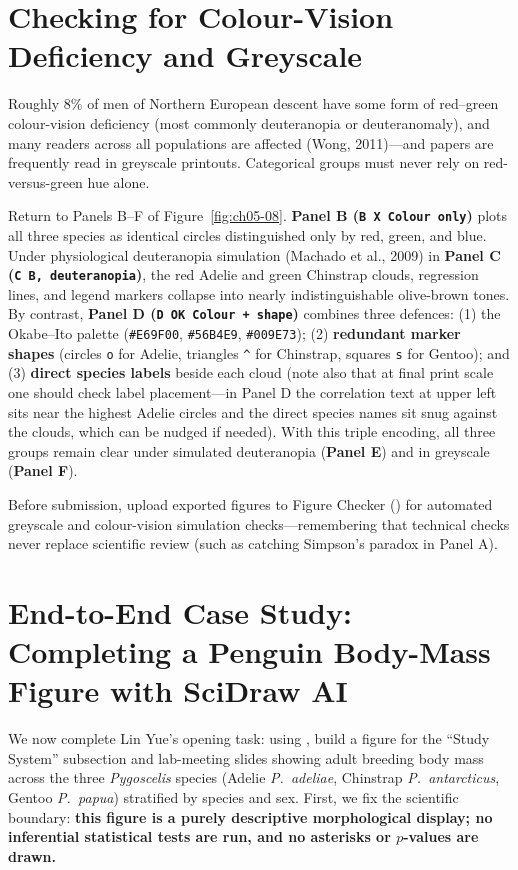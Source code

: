 \section{Checking for Colour-Vision Deficiency and Greyscale}

Roughly 8\% of men of Northern European descent have some form of red--green colour-vision deficiency (most commonly deuteranopia or deuteranomaly), and many readers across all populations are affected (Wong, 2011)—and papers are frequently read in greyscale printouts. Categorical groups must never rely on red-versus-green hue alone.

Return to Panels B--F of Figure~\ref{fig:ch05-08}. \textbf{Panel B (\texttt{B X Colour only})} plots all three species as identical circles distinguished only by red, green, and blue. Under physiological deuteranopia simulation (Machado et al., 2009) in \textbf{Panel C (\texttt{C B, deuteranopia})}, the red Adelie and green Chinstrap clouds, regression lines, and legend markers collapse into nearly indistinguishable olive-brown tones. By contrast, \textbf{Panel D (\texttt{D OK Colour + shape})} combines three defences: (1) the Okabe--Ito palette (\texttt{\#E69F00}, \texttt{\#56B4E9}, \texttt{\#009E73}); (2) \textbf{redundant marker shapes} (circles \texttt{o} for Adelie, triangles \texttt{\^{}} for Chinstrap, squares \texttt{s} for Gentoo); and (3) \textbf{direct species labels} beside each cloud (note also that at final print scale one should check label placement—in Panel D the correlation text at upper left sits near the highest Adelie circles and the direct species names sit snug against the clouds, which can be nudged if needed). With this triple encoding, all three groups remain clear under simulated deuteranopia (\textbf{Panel E}) and in greyscale (\textbf{Panel F}).

Before submission, upload exported figures to \scidraw{} Figure Checker () for automated greyscale and colour-vision simulation checks—remembering that technical checks never replace scientific review (such as catching Simpson's paradox in Panel A).

\section{End-to-End Case Study: Completing a Penguin Body-Mass Figure with SciDraw AI}

We now complete Lin Yue's opening task: using , build a figure for the ``Study System'' subsection and lab-meeting slides showing adult breeding body mass across the three \emph{Pygoscelis} species (Adelie \emph{P.\ adeliae}, Chinstrap \emph{P.\ antarcticus}, Gentoo \emph{P.\ papua}) stratified by species and sex. First, we fix the scientific boundary: \textbf{this figure is a purely descriptive morphological display; no inferential statistical tests are run, and no asterisks or $p$-values are drawn.}

